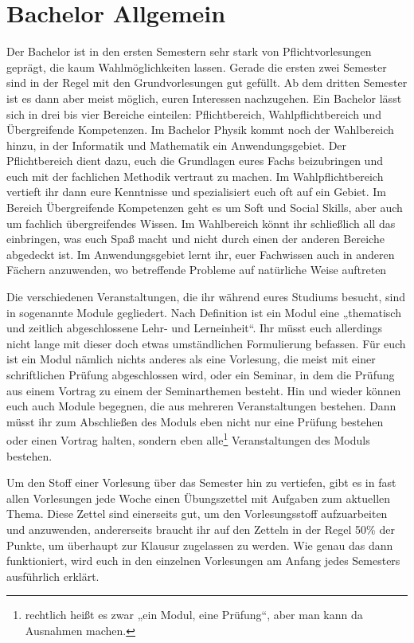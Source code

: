 \section{Bachelor Allgemein}
Der Bachelor ist in den ersten Semestern sehr stark von Pflichtvorlesungen geprägt, die kaum Wahlmöglichkeiten lassen. Gerade die ersten zwei Semester sind in der Regel mit den Grundvorlesungen gut gefüllt. Ab dem dritten Semester ist es dann aber meist möglich, euren Interessen nachzugehen. Ein Bachelor lässt sich in drei bis vier Bereiche einteilen: Pflichtbereich, Wahlpflichtbereich und Übergreifende Kompetenzen. Im Bachelor Physik kommt noch der Wahlbereich hinzu, in der Informatik und Mathematik ein Anwendungsgebiet. Der Pflichtbereich dient dazu, euch die Grundlagen eures Fachs beizubringen und euch mit der fachlichen Methodik vertraut zu machen. Im Wahlpflichtbereich vertieft ihr dann eure Kenntnisse und spezialisiert euch oft auf ein Gebiet. Im Bereich Übergreifende Kompetenzen geht es um Soft und Social Skills, aber auch um fachlich übergreifendes Wissen. Im Wahlbereich könnt ihr schließlich all das einbringen, was euch Spaß macht und nicht durch einen der anderen Bereiche abgedeckt ist. Im Anwendungsgebiet lernt ihr, euer Fachwissen auch in anderen Fächern anzuwenden, wo betreffende Probleme auf natürliche Weise auftreten

Die verschiedenen Veranstaltungen, die ihr während eures Studiums besucht, sind in sogenannte Module gegliedert. Nach Definition ist ein Modul eine „thematisch und zeitlich abgeschlossene Lehr- und Lerneinheit“. Ihr müsst euch allerdings nicht lange mit dieser doch etwas umständlichen Formulierung befassen. Für euch ist ein Modul nämlich nichts anderes als eine Vorlesung, die meist mit einer schriftlichen Prüfung abgeschlossen wird, oder ein Seminar, in dem die Prüfung aus einem Vortrag zu einem der Seminarthemen besteht. Hin und wieder können euch auch Module begegnen, die aus mehreren Veranstaltungen bestehen. Dann müsst ihr zum Abschließen des Moduls eben nicht nur eine Prüfung bestehen oder einen Vortrag halten, sondern eben alle\footnote{rechtlich heißt es zwar „ein Modul, eine Prüfung“, aber man kann da Ausnahmen machen.} Veranstaltungen des Moduls bestehen.

Um den Stoff einer Vorlesung über das Semester hin zu vertiefen, gibt es in fast allen Vorlesungen jede Woche einen Übungszettel mit Aufgaben zum aktuellen Thema. Diese Zettel sind einerseits gut, um den Vorlesungsstoff aufzuarbeiten und anzuwenden, andererseits braucht ihr auf den Zetteln in der Regel 50\% der Punkte, um überhaupt zur Klausur zugelassen zu werden. Wie genau das dann funktioniert, wird euch in den einzelnen Vorlesungen am Anfang jedes Semesters ausführlich erklärt.

